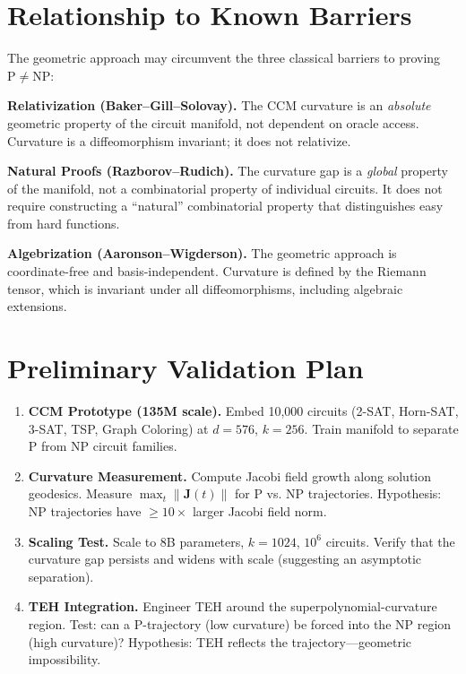 \documentclass{article}
\begin{document}
\section{Relationship to Known Barriers}
\label{sec:barriers}

The geometric approach may circumvent the three classical barriers to
proving $\mathrm{P} \neq \mathrm{NP}$:

\textbf{Relativization (Baker--Gill--Solovay).}  The CCM curvature
is an \emph{absolute} geometric property of the circuit manifold, not
dependent on oracle access.  Curvature is a diffeomorphism invariant;
it does not relativize.

\textbf{Natural Proofs (Razborov--Rudich).}  The curvature gap is a
\emph{global} property of the manifold, not a combinatorial property
of individual circuits.  It does not require constructing a
``natural'' combinatorial property that distinguishes easy from hard
functions.

\textbf{Algebrization (Aaronson--Wigderson).}  The geometric approach
is coordinate-free and basis-independent.  Curvature is defined by
the Riemann tensor, which is invariant under all diffeomorphisms,
including algebraic extensions.

\section{Preliminary Validation Plan}
\label{sec:validation}

\begin{enumerate}
  \item \textbf{CCM Prototype (135M scale).}  Embed 10,000 circuits
    (2-SAT, Horn-SAT, 3-SAT, TSP, Graph Coloring) at $d=576$, $k=256$.
    Train manifold to separate P from NP circuit families.
  \item \textbf{Curvature Measurement.}  Compute Jacobi field growth
    along solution geodesics.  Measure $\max_t \|\mathbf{J}(t)\|$ for
    P vs. NP trajectories.  Hypothesis: NP trajectories have
    $\geq 10\times$ larger Jacobi field norm.
  \item \textbf{Scaling Test.}  Scale to 8B parameters, $k=1024$,
    $10^6$ circuits.  Verify that the curvature gap persists and
    widens with scale (suggesting an asymptotic separation).
  \item \textbf{TEH Integration.}  Engineer TEH around the
    superpolynomial-curvature region.  Test: can a P-trajectory
    (low curvature) be forced into the NP region (high curvature)?
    Hypothesis: TEH reflects the trajectory---geometric impossibility.
\end{enumerate}
\end{document}
